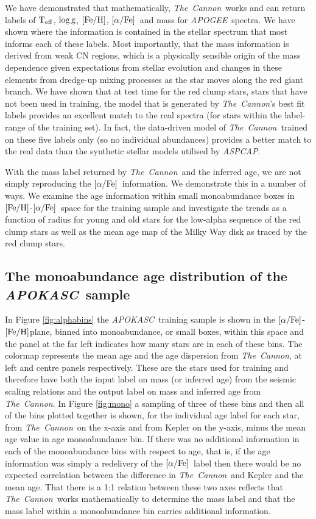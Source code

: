 \documentclass[12pt, preprint]{aastex}
\newcommand{\project}[1]{\textsl{#1}}
\newcommand{\tc}{\project{The~Cannon}}
\newcommand{\apogee}{\project{APOGEE}}
\newcommand{\apokasc}{\project{APOKASC}}
\newcommand{\aspcap}{\project{ASPCAP}}
\newcommand{\teff}{\mbox{$\rm T_{eff}$}}
\newcommand{\feh}{\mbox{$\rm [Fe/H]$}}
\newcommand{\alphafe}{\mbox{$\rm [\alpha/Fe]$}}
\newcommand{\logg}{\mbox{$\rm \log g$}}
\begin{document}
We have demonstrated that mathematically, \tc\ works and can return labels of \teff, \logg, \feh, \alphafe\ and mass for \apogee\ spectra. We have shown where the information is contained in the stellar spectrum that most informs each of these labels. Most importantly, that the mass information is derived from weak CN regions, which is a physically sensible origin of the mass dependence given expectations from stellar evolution and changes in these elements from dredge-up mixing processes as the star moves along the red giant branch. We have shown that at test time for the red clump stars, stars that have not been used in training, the model that is generated by \tc's best fit labels provides an excellent match to the real spectra (for stars within the label-range of the training set). In fact, the data-driven model of \tc\ trained on these five labels only (so no individual abundances) provides a better match to the real data than the synthetic stellar models utilised by \aspcap.

With the mass label returned by \tc\ and the inferred age, we are not simply reproducing the \alphafe\ information. We demonstrate this in a number of ways. We examine the age information within small monoabundance boxes in \feh-\alphafe\ space for the training sample and investigate the trends as a function of radius for young and old stars for the low-alpha sequence of the red clump stars as well as the mean age map of the Milky Way disk as traced by the red clump stars.


\subsection{The monoabundance age distribution of the \apokasc\ sample}

In Figure \ref{fig:alphabins} the \apokasc\ training sample is shown in the \alphafe-\feh plane, binned into monoabundance, or small boxes, within this space and the panel at the far left indicates how many stars are in each of these bins. The colormap represents the mean age and the age dispersion from \tc, at left and centre panels respectively. These are the stars used for training and therefore have both the input label on mass (or inferred age) from the seismic scaling relations and the output label on mass and inferred age from \tc. In Figure \ref{fig:mono} a sampling of three of these bins and then all of the bins plotted together is shown, for the individual age label for each star, from \tc\ on the x-axis and from Kepler on the y-axis, minus the mean age value in age monoabundance bin. If there was no additional information in each of the monoabundance bins with respect to age, that is, if the age information was simply a redelivery of the \alphafe\ label then there would be no expected correlation between the difference in \tc\ and Kepler and the mean age. That there is a 1:1 relation between these two axes reflects that \tc\ works mathematically to determine the mass label and that the mass label within a monoabundance bin carries additional information.
\end{document}
